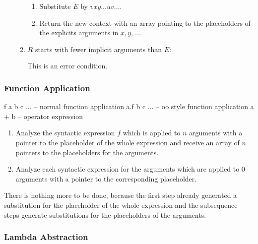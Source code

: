 \begin{enumerate}
\begin{enumerate}
\begin{enumerate}
    \item Substitute $E$ by $v x y \ldots u v \ldots$.

    \item Return the new context with an array pointing to the placeholders of
      the explicits arguments in $x, y, \ldots$.
    \end{enumerate}


  \item $R$ starts with fewer implicit arguments than $E$:

    This is an error condition.

  \end{enumerate}

\end{enumerate}



\subsubsection{Function Application}


\begin{alba}
  f a b c ...             -- normal function application
  a.f b c ...             -- oo style function application
  a + b                   -- operator expression
\end{alba}


\begin{enumerate}

\item Analyze the syntactic expression $f$ which is applied to $n$ arguments
  with a pointer to the placeholder of the whole expression and receive an
  array of $n$ pointers to the placeholders for the arguments.

\item Analyze each syntactic expression for the arguments which are applied to
  $0$ arguments with a pointer to the corresponding placeholder.

\end{enumerate}

There is nothing more to be done, because the first step already generated a
substitution for the placeholder of the whole expression and the subsequence
steps generate substitutions for the placeholders of the arguments.




\vskip 5mm
\subsubsection{Lambda Abstraction}

